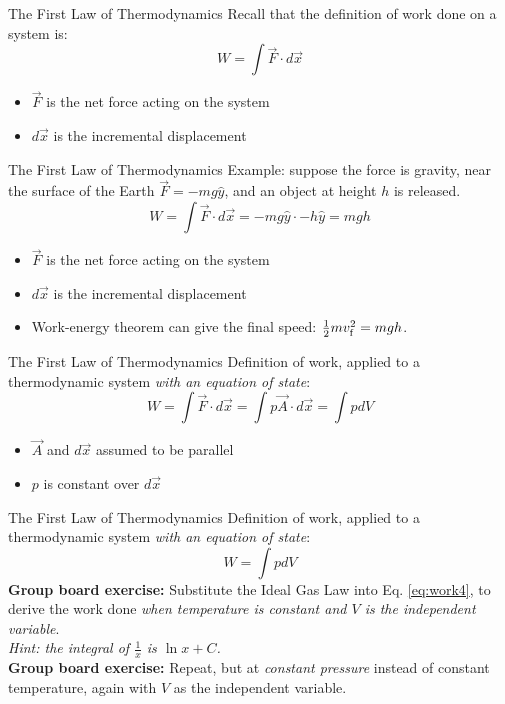 \documentclass{beamer}
\begin{document}
\begin{frame}{The First Law of Thermodynamics}
Recall that the definition of work done on a system is:
\begin{equation}
W = \int \vec{F} \cdot d\vec{x}
\label{eq:work}
\end{equation}
\begin{itemize}
\item $\vec{F}$ is the net force acting on the system
\item $d\vec{x}$ is the incremental displacement
\end{itemize}
\end{frame}

\begin{frame}{The First Law of Thermodynamics}
Example: suppose the force is gravity, near the surface of the Earth $\vec{F} = -mg \hat{y}$, and an object at height $h$ is released.
\begin{equation}
W = \int \vec{F} \cdot d\vec{x} = -mg \hat{y} \cdot -h\hat{y} = mgh
\label{eq:work2}
\end{equation}
\begin{itemize}
\item $\vec{F}$ is the net force acting on the system
\item $d\vec{x}$ is the incremental displacement
\item Work-energy theorem can give the final speed: $\frac{1}{2}mv_{\rm f}^2 = mgh$.
\end{itemize}
\end{frame}

\begin{frame}{The First Law of Thermodynamics}
Definition of work, applied to a thermodynamic system \textit{with an equation of state}:
\begin{equation}
W = \int \vec{F} \cdot d\vec{x} = \int p\vec{A} \cdot d\vec{x} = \int p dV
\label{eq:work3}
\end{equation}
\begin{itemize}
\item $\vec{A}$ and $d\vec{x}$ assumed to be parallel
\item $p$ is constant over $d\vec{x}$
\end{itemize}
\end{frame}

\begin{frame}{The First Law of Thermodynamics}
Definition of work, applied to a thermodynamic system \textit{with an equation of state}:
\begin{equation}
W = \int p dV
\label{eq:work4}
\end{equation}
\textbf{Group board exercise:} Substitute the Ideal Gas Law into Eq. \ref{eq:work4}, to derive the work done \textit{when temperature is constant and $V$ is the independent variable}. \\ \vspace{0.5cm}
\textit{Hint: the integral of $\frac{1}{x}$ is $\ln x + C$.} \\
\vspace{0.5cm}
\textbf{Group board exercise:} Repeat, but at \textit{constant pressure} instead of constant temperature, again with $V$ as the independent variable.
\end{frame}
\end{document}
